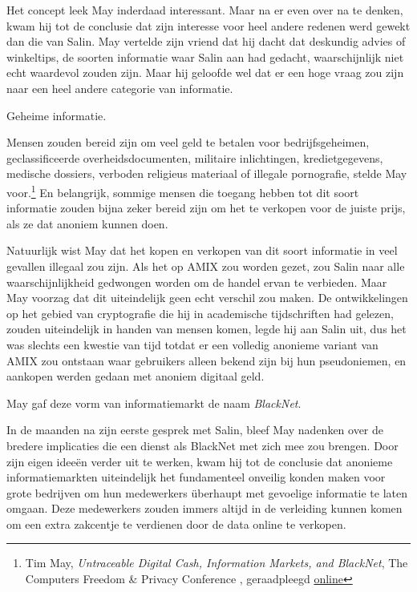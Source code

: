 \documentclass[
  a5paper,
  smalldemyvopaper,11pt,twoside,onecolumn,openright,extrafontsizes,
hidelinks]{memoir}
\begin{document}
Het concept leek May inderdaad interessant. Maar na er even over na te
denken, kwam hij tot de conclusie dat zijn interesse voor heel andere
redenen werd gewekt dan die van Salin. May vertelde zijn vriend dat hij
dacht dat deskundig advies of winkeltips, de soorten informatie waar
Salin aan had gedacht, waarschijnlijk niet echt waardevol zouden zijn.
Maar hij geloofde wel dat er een hoge vraag zou zijn naar een heel
andere categorie van informatie.

Geheime informatie.

Mensen zouden bereid zijn om veel geld te betalen voor bedrijfsgeheimen,
geclassificeerde overheidsdocumenten, militaire inlichtingen,
kredietgegevens, medische dossiers, verboden religieus materiaal of
illegale pornografie, stelde May voor.\footnote{Tim May,
  \emph{Untraceable Digital Cash, Information Markets, and BlackNet},
  The Computers Freedom \& Privacy Conference , geraadpleegd
  \href{https://web.archive.org/web/20130501134401/https://osaka.law.miami.edu//~froomkin/articles/tcmay.htm}{online}}
En belangrijk, sommige mensen die toegang hebben tot dit soort
informatie zouden bijna zeker bereid zijn om het te verkopen voor de
juiste prijs, als ze dat anoniem kunnen doen.

Natuurlijk wist May dat het kopen en verkopen van dit soort informatie
in veel gevallen illegaal zou zijn. Als het op AMIX zou worden gezet,
zou Salin naar alle waarschijnlijkheid gedwongen worden om de handel
ervan te verbieden. Maar May voorzag dat dit uiteindelijk geen echt
verschil zou maken. De ontwikkelingen op het gebied van cryptografie die
hij in academische tijdschriften had gelezen, zouden uiteindelijk in
handen van mensen komen, legde hij aan Salin uit, dus het was slechts
een kwestie van tijd totdat er een volledig anonieme variant van AMIX
zou ontstaan waar gebruikers alleen bekend zijn bij hun pseudoniemen, en
aankopen werden gedaan met anoniem digitaal geld.

May gaf deze vorm van informatiemarkt de naam \emph{BlackNet}.

In de maanden na zijn eerste gesprek met Salin, bleef May nadenken over
de bredere implicaties die een dienst als BlackNet met zich mee zou
brengen. Door zijn eigen ideeën verder uit te werken, kwam hij tot de
conclusie dat anonieme informatiemarkten uiteindelijk het fundamenteel
onveilig konden maken voor grote bedrijven om hun medewerkers überhaupt
met gevoelige informatie te laten omgaan. Deze medewerkers zouden immers
altijd in de verleiding kunnen komen om een extra zakcentje te verdienen
door de data online te verkopen.
\end{document}
